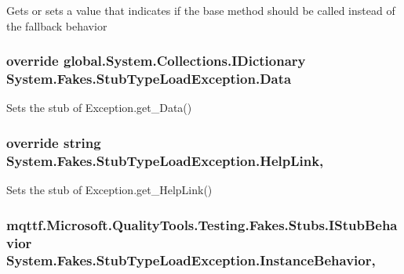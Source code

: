Gets or sets a value that indicates if the base method should be called instead of the fallback behavior

\hypertarget{class_system_1_1_fakes_1_1_stub_type_load_exception_a1cc1623a985562819411639c46035d39}{
\subsubsection[{Data}]{\setlength{\rightskip}{0pt plus 5cm}override global.\-System.\-Collections.\-I\-Dictionary System.\-Fakes.\-Stub\-Type\-Load\-Exception.\-Data\hspace{0.3cm}{\ttfamily [get]}}}\label{class_system_1_1_fakes_1_1_stub_type_load_exception_a1cc1623a985562819411639c46035d39}


Sets the stub of Exception.\-get\-\_\-\-Data()

\hypertarget{class_system_1_1_fakes_1_1_stub_type_load_exception_a65a9b3f323bee4a371f7a9e96af2694e}{
\subsubsection[{Help\-Link}]{\setlength{\rightskip}{0pt plus 5cm}override string System.\-Fakes.\-Stub\-Type\-Load\-Exception.\-Help\-Link\hspace{0.3cm}{\ttfamily [get]}, {\ttfamily [set]}}}\label{class_system_1_1_fakes_1_1_stub_type_load_exception_a65a9b3f323bee4a371f7a9e96af2694e}


Sets the stub of Exception.\-get\-\_\-\-Help\-Link()

\hypertarget{class_system_1_1_fakes_1_1_stub_type_load_exception_a8ea1511b8a4031c7f43adc1746047f09}{
\subsubsection[{Instance\-Behavior}]{\setlength{\rightskip}{0pt plus 5cm}mqttf.\-Microsoft.\-Quality\-Tools.\-Testing.\-Fakes.\-Stubs.\-I\-Stub\-Behavior System.\-Fakes.\-Stub\-Type\-Load\-Exception.\-Instance\-Behavior\hspace{0.3cm}{\ttfamily [get]}, {\ttfamily [set]}}}\label{class_system_1_1_fakes_1_1_stub_type_load_exception_a8ea1511b8a4031c7f43adc1746047f09}


